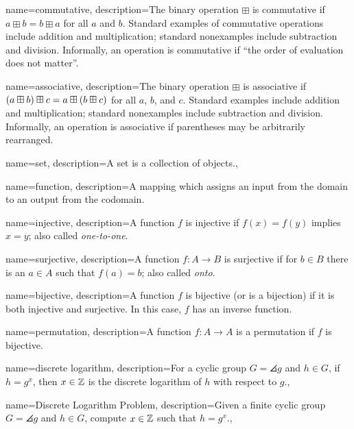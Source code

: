 {
    name={commutative},
    description={The binary operation $\boxplus$ is commutative if
        $a\boxplus b = b\boxplus a$ for all $a$ and $b$.
        Standard examples of commutative operations include addition
        and multiplication;
        standard nonexamples include subtraction and division.
        Informally, an operation is commutative if
        ``the order of evaluation does not matter''.}
}

{
    name={associative},
    description={The binary operation $\boxplus$ is associative if
        $\left( a\boxplus b \right)\boxplus c = a\boxplus \left( b\boxplus c \right)$
        for all $a$, $b$, and $c$.
        Standard examples include addition and multiplication;
        standard nonexamples include subtraction and division.
        Informally, an operation is associative if parentheses may be
        arbitrarily rearranged.}
}

{
    name={set},
    description={A set is a collection of objects.},
}

{
    name={function},
    description={A mapping which assigns an input from the domain
        to an output from the codomain.}
}

{
    name={injective},
    description={A function $f$ is injective if $f(x) = f(y)$
        implies $x=y$; also called \emph{one-to-one}.}
}

{
    name={surjective},
    description={A function $f:A\to B$ is surjective if for $b\in B$
        there is an $a\in A$ such that $f(a)=b$; also called \emph{onto}.}
}

{
    name={bijective},
    description={A function $f$ is bijective (or is a bijection) if it is
        both \gls{injective} and \gls{surjective}.
        In this case, $f$ has an inverse function.}
}

{
    name={permutation},
    description={A function $f:A\to A$ is a permutation if $f$
        is \gls{bijective}.}
}

{
    name={discrete logarithm},
    description={For a \gls{cyclic group} $G = \angles{g}$
        and $h\in G$, if $h = g^{x}$, then $x\in\mathbb{Z}$ is the discrete logarithm
        of $h$ with respect to $g$.},
}

{
    name={Discrete Logarithm Problem},
    description={Given a \gls{finite cyclic group} $G = \angles{g}$
        and $h\in G$, compute $x\in\mathbb{Z}$ such that $h = g^{x}$.},
}

